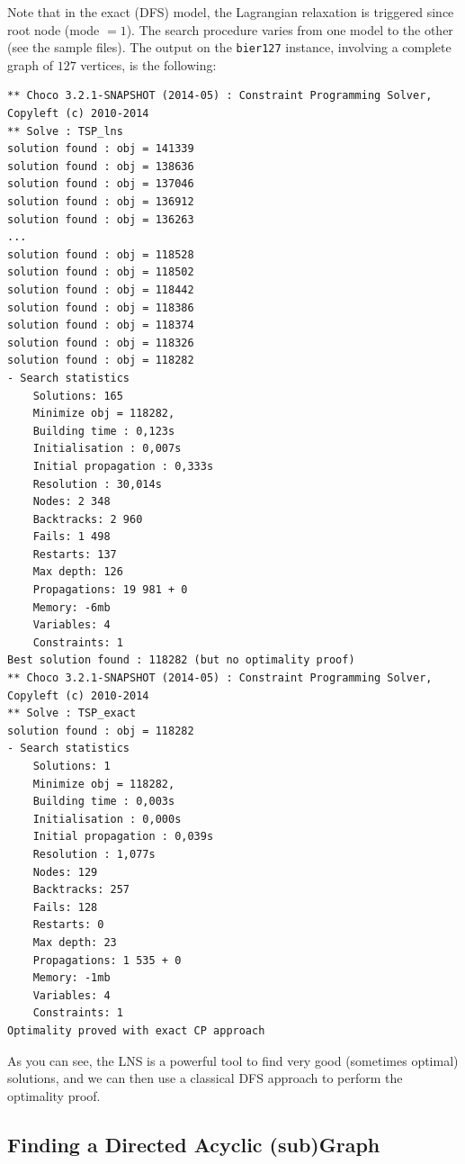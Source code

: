 \documentclass{article}
\begin{document}
Note that in the exact (DFS) model, the Lagrangian relaxation is triggered since root node (mode $=1$). 
The search procedure varies from one model to the other (see the sample files). 
The output on the \texttt{bier127} instance, involving a complete graph of $127$ vertices, is the following:

\begin{lstlisting}
** Choco 3.2.1-SNAPSHOT (2014-05) : Constraint Programming Solver, Copyleft (c) 2010-2014
** Solve : TSP_lns
solution found : obj = 141339
solution found : obj = 138636
solution found : obj = 137046
solution found : obj = 136912
solution found : obj = 136263
...
solution found : obj = 118528
solution found : obj = 118502
solution found : obj = 118442
solution found : obj = 118386
solution found : obj = 118374
solution found : obj = 118326
solution found : obj = 118282
- Search statistics
	Solutions: 165
	Minimize obj = 118282,
	Building time : 0,123s
	Initialisation : 0,007s
	Initial propagation : 0,333s
	Resolution : 30,014s
	Nodes: 2 348
	Backtracks: 2 960
	Fails: 1 498
	Restarts: 137
	Max depth: 126
	Propagations: 19 981 + 0
	Memory: -6mb
	Variables: 4
	Constraints: 1
Best solution found : 118282 (but no optimality proof)
** Choco 3.2.1-SNAPSHOT (2014-05) : Constraint Programming Solver, Copyleft (c) 2010-2014
** Solve : TSP_exact
solution found : obj = 118282
- Search statistics
	Solutions: 1
	Minimize obj = 118282,
	Building time : 0,003s
	Initialisation : 0,000s
	Initial propagation : 0,039s
	Resolution : 1,077s
	Nodes: 129
	Backtracks: 257
	Fails: 128
	Restarts: 0
	Max depth: 23
	Propagations: 1 535 + 0
	Memory: -1mb
	Variables: 4
	Constraints: 1
Optimality proved with exact CP approach
\end{lstlisting}

As you can see, the LNS is a powerful tool to find very good (sometimes optimal) solutions, and we can then use a classical DFS approach to perform the optimality proof. 

\subsection{Finding a Directed Acyclic (sub)Graph}
\end{document}
